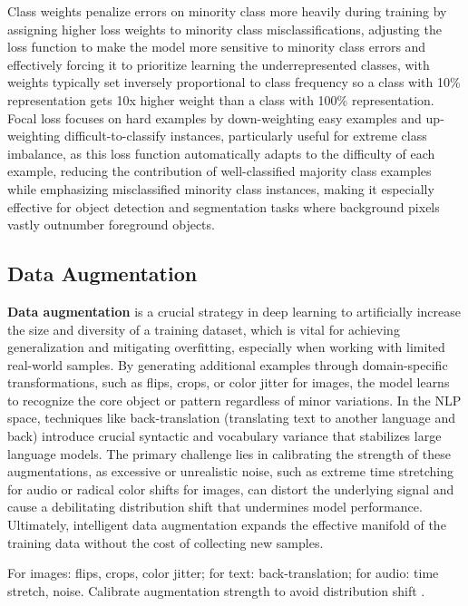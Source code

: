 Class weights penalize errors on minority class more heavily during training by assigning higher loss weights to minority class misclassifications, adjusting the loss function to make the model more sensitive to minority class errors and effectively forcing it to prioritize learning the underrepresented classes, with weights typically set inversely proportional to class frequency so a class with 10\% representation gets 10x higher weight than a class with 100\% representation. Focal loss focuses on hard examples by down-weighting easy examples and up-weighting difficult-to-classify instances, particularly useful for extreme class imbalance, as this loss function automatically adapts to the difficulty of each example, reducing the contribution of well-classified majority class examples while emphasizing misclassified minority class instances, making it especially effective for object detection and segmentation tasks where background pixels vastly outnumber foreground objects.


\subsection{Data Augmentation}

\textbf{Data augmentation} is a crucial strategy in deep learning to artificially increase the size and diversity of a training dataset, which is vital for achieving generalization and mitigating overfitting, especially when working with limited real-world samples. By generating additional examples through domain-specific transformations, such as flips, crops, or color jitter for images, the model learns to recognize the core object or pattern regardless of minor variations. In the NLP space, techniques like back-translation (translating text to another language and back) introduce crucial syntactic and vocabulary variance that stabilizes large language models. The primary challenge lies in calibrating the strength of these augmentations, as excessive or unrealistic noise, such as extreme time stretching for audio or radical color shifts for images, can distort the underlying signal and cause a debilitating distribution shift that undermines model performance. Ultimately, intelligent data augmentation expands the effective manifold of the training data without the cost of collecting new samples.

For images: flips, crops, color jitter; for text: back-translation; for audio: time stretch, noise. Calibrate augmentation strength to avoid distribution shift \textcite{Prince2023}.

